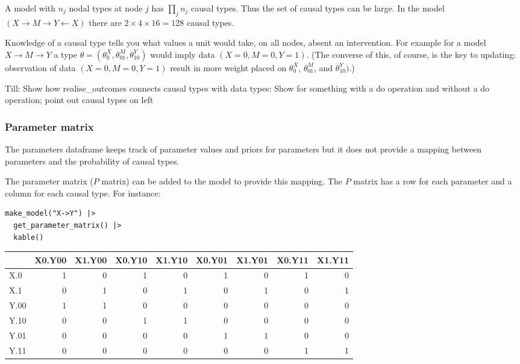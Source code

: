 \documentclass[
  article]{jss}
\begin{document}
A model with \(n_j\) nodal types at node \(j\) has \(\prod_jn_j\) causal
types. Thus the set of causal types can be large. In the model
\((X\rightarrow M \rightarrow Y \leftarrow X)\) there are
\(2\times 4\times 16 = 128\) causal types.

Knowledge of a causal type tells you what values a unit would take, on
all nodes, absent an intervention. For example for a model
\(X \rightarrow M \rightarrow Y\) a type
\(\theta = (\theta^X_0, \theta^M_{01}, \theta^Y_{10})\) would imply data
\((X=0, M=0, Y=1)\). (The converse of this, of course, is the key to
updating: observation of data \((X=0, M=0, Y=1)\) result in more weight
placed on \(\theta^X_0\), \(\theta^M_{01}\), and \(\theta^Y_{10})\).)

Till: Show how realise\_outcomes connects causal types with data types:
Show for something with a do operation and without a do operation; point
out causal types on left

\hypertarget{parameter-matrix}{%
\subsubsection{Parameter matrix}\label{parameter-matrix}}

The parameters dataframe keeps track of parameter values and priors for
parameters but it does not provide a mapping between parameters and the
probability of causal types.

The parameter matrix (\(P\) matrix) can be added to the model to provide
this mapping. The \(P\) matrix has a row for each parameter and a column
for each causal type. For instance:

\begin{verbatim}
make_model("X->Y") |> 
  get_parameter_matrix() |>
  kable()
\end{verbatim}

\begin{longtable}[]{@{}lrrrrrrrr@{}}
\toprule\noalign{}
& X0.Y00 & X1.Y00 & X0.Y10 & X1.Y10 & X0.Y01 & X1.Y01 & X0.Y11 &
X1.Y11 \\
\midrule\noalign{}
\endhead
\bottomrule\noalign{}
\endlastfoot
X.0 & 1 & 0 & 1 & 0 & 1 & 0 & 1 & 0 \\
X.1 & 0 & 1 & 0 & 1 & 0 & 1 & 0 & 1 \\
Y.00 & 1 & 1 & 0 & 0 & 0 & 0 & 0 & 0 \\
Y.10 & 0 & 0 & 1 & 1 & 0 & 0 & 0 & 0 \\
Y.01 & 0 & 0 & 0 & 0 & 1 & 1 & 0 & 0 \\
Y.11 & 0 & 0 & 0 & 0 & 0 & 0 & 1 & 1 \\
\end{longtable}
\end{document}
